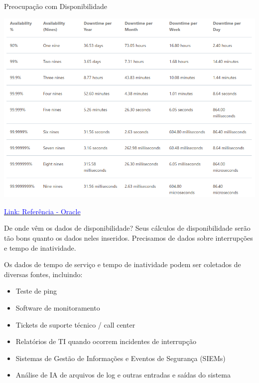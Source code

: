 \begin{frame}{Preocupação com Disponibilidade}
\centering

        \includegraphics[width=0.7\linewidth]{Figuras/9s-disponibilidade.png}


\href{https://docs.oracle.com/en-us/iaas/Content/cloud-adoption-framework/high-availability.htm}{\textcolor{blue}{Link: Referência - Oracle}}

\end{frame}

\begin{frame}{De onde vêm os dados de disponibilidade?}
Seus cálculos de disponibilidade serão tão bons quanto os dados neles inseridos. Precisamos de dados  sobre interrupções e tempo de inatividade. 

Os dados de tempo de serviço e tempo de inatividade podem ser coletados de diversas fontes, incluindo:

\vspace{0.3cm}
\begin{itemize}
    \item Teste de ping
    \item Software de monitoramento
    \item Tickets de suporte técnico / call center
    \item Relatórios de TI quando ocorrem incidentes de interrupção
    \item Sistemas de Gestão de Informações e Eventos de Segurança (SIEMs)
    \item Análise de IA de arquivos de log e outras entradas e saídas do sistema
\end{itemize}


\end{frame}



